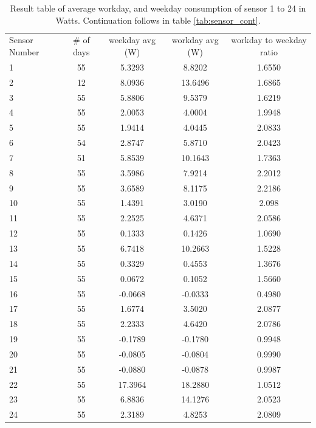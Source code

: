 \begin{table}[h]
	\centering
	\begin{tabular}{l|c|c|c|c}
		Sensor Number & \# of days & weekday avg (W) & workday avg (W)& workday to weekday ratio \\
		1 & 55 & 5.3293 & 8.8202 & 1.6550 \\
		2 & 12 & 8.0936 & 13.6496 & 1.6865 \\ 
		3 & 55 & 5.8806 & 9.5379 & 1.6219  \\ 
		4 & 55 & 2.0053 & 4.0004 & 1.9948 \\
		5 & 55 & 1.9414 & 4.0445 & 2.0833 \\
		6 & 54 & 2.8747 & 5.8710 & 2.0423 \\ 
		7 & 51 & 5.8539 & 10.1643 & 1.7363  \\ 
		8 & 55 & 3.5986 & 7.9214 & 2.2012 \\
		9 & 55 & 3.6589 & 8.1175 & 2.2186 \\
		10 & 55 & 1.4391 & 3.0190 & 2.098 \\
		11 & 55 & 2.2525 & 4.6371 & 2.0586 \\ 
		12 & 55 & 0.1333 & 0.1426 & 1.0690 \\
		13 & 55 & 6.7418 & 10.2663 & 1.5228 \\
		14 & 55 & 0.3329 & 0.4553 & 1.3676 \\
		15 & 55 & 0.0672 & 0.1052 & 1.5660 \\
		16 & 55 & -0.0668 & -0.0333 & 0.4980 \\
		17 & 55 & 1.6774 & 3.5020 & 2.0877 \\
		18 & 55 & 2.2333 & 4.6420 & 2.0786 \\
		19 & 55 & -0.1789 & -0.1780 & 0.9948 \\
		20 & 55 & -0.0805 & -0.0804 & 0.9990 \\ 
		21 & 55 & -0.0880 & -0.0878 & 0.9987 \\
		22 & 55 & 17.3964 & 18.2880 & 1.0512 \\
		23 & 55 & 6.8836 & 14.1276 & 2.0523 \\
		24 & 55 & 2.3189 & 4.8253 & 2.0809 \\
	\end{tabular}
	\caption{Result table of average \gls{workday}, and weekday consumption of sensor 1 to 24 in Watts. Continuation follows in table \ref{tab:sensor_cont}.}
	\label{tab:sensor}
\end{table}

